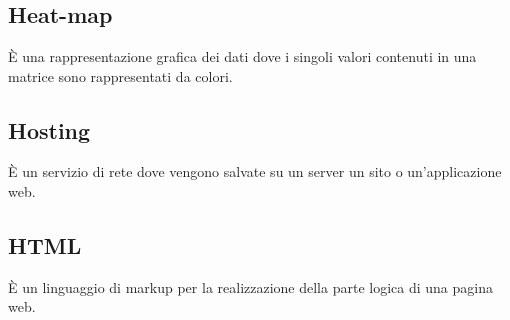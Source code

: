 \section{}
\subsection*{Heat-map} È una rappresentazione grafica dei dati dove i singoli valori contenuti in una matrice sono rappresentati da colori.

\subsection*{Hosting} È un servizio di rete dove vengono salvate su un server un sito o un'applicazione web.

\subsection*{HTML} È un linguaggio di markup per la realizzazione della parte logica di una pagina web.